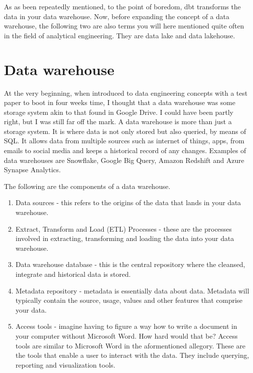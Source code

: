 \documentclass[
]{book}
\begin{document}
As as been repeatedly mentioned, to the point of boredom, dbt transforms the data in your data warehouse. Now, before expanding the concept of a data warehouse, the following two are also terms you will here mentioned quite often in the field of analytical engineering. They are data lake and data lakehouse.

\hypertarget{data-warehouse}{%
\section{Data warehouse}\label{data-warehouse}}

At the very beginning, when introduced to data engineering concepts with a test paper to boot in four weeks time, I thought that a data warehouse was some storage system akin to that found in Google Drive. I could have been partly right, but I was still far off the mark. A data warehouse is more than just a storage system. It is where data is not only stored but also queried, by means of SQL. It allows data from multiple sources such as internet of things, apps, from emails to social media and keeps a historical record of any changes. Examples of data warehouses are Snowflake, Google Big Query, Amazon Redshift and Azure Synapse Analytics.

The following are the components of a data warehouse.

\begin{enumerate}
\def\labelenumi{\arabic{enumi}.}
\item
  Data sources - this refers to the origins of the data that lands in your data warehouse.
\item
  Extract, Transform and Load (ETL) Processes - these are the processes involved in extracting, transforming and loading the data into your data warehouse.
\item
  Data warehouse database - this is the central repository where the cleansed, integrate and historical data is stored.
\item
  Metadata repository - metadata is essentially data about data. Metadata will typically contain the source, usage, values and other features that comprise your data.
\item
  Access tools - imagine having to figure a way how to write a document in your computer without Microsoft Word. How hard would that be? Access tools are similar to Microsoft Word in the aformentioned allegory. These are the tools that enable a user to interact with the data. They include querying, reporting and visualization tools.
\end{enumerate}
\end{document}
